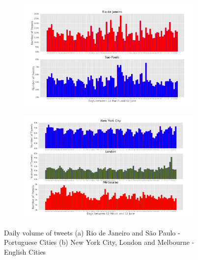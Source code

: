 \begin{figure}[htbp]
	\centering
	\begin{subfigure}[htbp]{0.8\textwidth}
		\includegraphics[width=\linewidth]{figures/rio_sp_whole_months.png}
		\caption{}
		\label{subfig:portuguese_cities_whole_months} 
	\end{subfigure}
	
	\begin{subfigure}[htbp]{0.8\textwidth}
		\includegraphics[width=\linewidth]{figures/nyc_london_melbourne_whole_months.png}
		\caption{}
		\label{subfig:english_cities_whole_months}
	\end{subfigure}
	
	\caption[Daily volume of tweets]{Daily volume of tweets (a) Rio de Janeiro and São Paulo - Portuguese Cities (b) New York City, London and Melbourne - English Cities}
	\label{fig:daily_distribution}
\end{figure}

